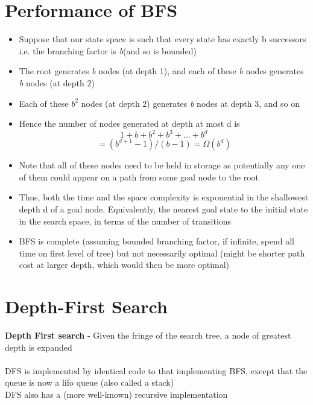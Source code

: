\documentclass{article}[18pt]
\begin{document}
\section{Performance of BFS}
\begin{itemize}
	\item Suppose that our state space is such that every state has exactly b successors i.e. the branching factor is \textit{b}(and so is bounded)
	\item The root generates \textit{b} nodes (at depth 1), and each of these \textit{b} nodes generates \textit{b} nodes (at depth 2)
	\item Each of these $b^2$ nodes (at depth 2) generates \textit{b} nodes at depth 3, and so on
	\item Hence the number of nodes generated at depth at most d is
	$$1+b+b^2+b^3+...+ b^d$$
	$$=(b^{d+1}-1)/(b-1)=\Omega(b^d)$$
	\item Note that all of these nodes need to be held in storage as potentially any one of them could appear on a path from some goal node to the root
	\item Thus, both the time and the space complexity is exponential in the shallowest depth d of a goal node. Equivalently, the nearest goal state to the initial state in the search space, in terms of the number of transitions
	\item BFS is complete (assuming bounded branching factor, if infinite, spend all time on first level of tree) but not necessarily optimal (might be shorter path cost at larger depth, which would then be more optimal)
\end{itemize}
\section{Depth-First Search}
\textbf{Depth First search} - Given the fringe of the search tree, a node of greatest depth is expanded\\
\\
DFS is implemented by identical code to that implementing BFS, except that the queue is now a lifo queue (also called a stack)\\
DFS also has a (more well-known) recursive implementation
\end{document}
